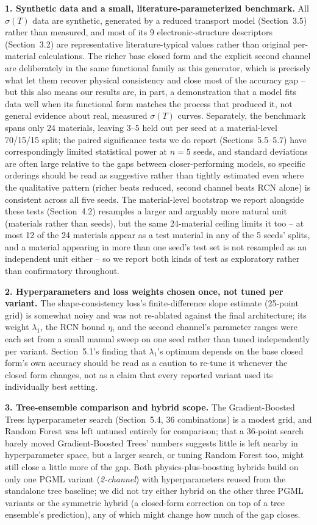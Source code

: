 \documentclass[11pt]{article}
\begin{document}
\textbf{1. Synthetic data and a small, literature-parameterized benchmark.} All $\sigma(T)$ data are synthetic, generated by a reduced transport model (Section~3.5) rather than measured, and most of its 9 electronic-structure descriptors (Section~3.2) are representative literature-typical values rather than original per-material calculations. The richer base closed form and the explicit second channel are deliberately in the same functional family as this generator, which is precisely what let them recover physical consistency and close most of the accuracy gap -- but this also means our results are, in part, a demonstration that a model fits data well when its functional form matches the process that produced it, not general evidence about real, measured $\sigma(T)$ curves. Separately, the benchmark spans only 24 materials, leaving 3--5 held out per seed at a material-level 70/15/15 split; the paired significance tests we do report (Sections~5.5--5.7) have correspondingly limited statistical power at $n=5$ seeds, and standard deviations are often large relative to the gaps between closer-performing models, so specific orderings should be read as suggestive rather than tightly estimated even where the qualitative pattern (richer beats reduced, second channel beats RCN alone) is consistent across all five seeds. The material-level bootstrap we report alongside these tests (Section~4.2) resamples a larger and arguably more natural unit (materials rather than seeds), but the same 24-material ceiling limits it too -- at most 12 of the 24 materials appear as a test material in any of the 5 seeds' splits, and a material appearing in more than one seed's test set is not resampled as an independent unit either -- so we report both kinds of test as exploratory rather than confirmatory throughout.

\textbf{2. Hyperparameters and loss weights chosen once, not tuned per variant.} The shape-consistency loss's finite-difference slope estimate (25-point grid) is somewhat noisy and was not re-ablated against the final architecture; its weight $\lambda_1$, the RCN bound $\eta$, and the second channel's parameter ranges were each set from a small manual sweep on one seed rather than tuned independently per variant. Section~5.1's finding that $\lambda_1$'s optimum depends on the base closed form's own accuracy should be read as a caution to re-tune it whenever the closed form changes, not as a claim that every reported variant used its individually best setting.

\textbf{3. Tree-ensemble comparison and hybrid scope.} The Gradient-Boosted Trees hyperparameter search (Section~5.4, 36 combinations) is a modest grid, and Random Forest was left untuned entirely for comparison; that a 36-point search barely moved Gradient-Boosted Trees' numbers suggests little is left nearby in hyperparameter space, but a larger search, or tuning Random Forest too, might still close a little more of the gap. Both physics-plus-boosting hybrids build on only one PGML variant (\emph{2-channel}) with hyperparameters reused from the standalone tree baseline; we did not try either hybrid on the other three PGML variants or the symmetric hybrid (a closed-form correction on top of a tree ensemble's prediction), any of which might change how much of the gap closes.
\end{document}
